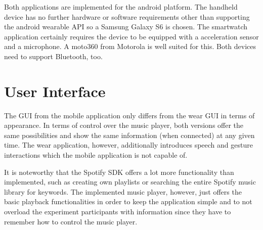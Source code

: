 Both applications are implemented for the android platform. The handheld device has no further hardware or software requirements other than supporting the android wearable \ac{API} so a Samsung Galaxy S6 is chosen. The smartwatch application certainly requires the device to be equipped with a acceleration sensor and a microphone. A moto360 from Motorola is well suited for this. Both devices need to support Bluetooth, too.

\section{User Interface}\label{sec:UserInterface}
The \ac{GUI} from the mobile application only differs from the wear \ac{GUI} in terms of appearance. In terms of control over the music player, both versions offer the same possibilities and show the same information (when connected) at any given time. The wear application, however, additionally introduces speech and gesture interactions which the mobile application is not capable of.

It is noteworthy that the Spotify \ac{SDK} offers a lot more functionality than implemented, such as creating own playlists or searching the entire Spotify music library for keywords. The implemented music player, however, just offers the basic playback functionalities in order to keep the application simple and to not overload the experiment participants with information since they have to remember how to control the music player.

